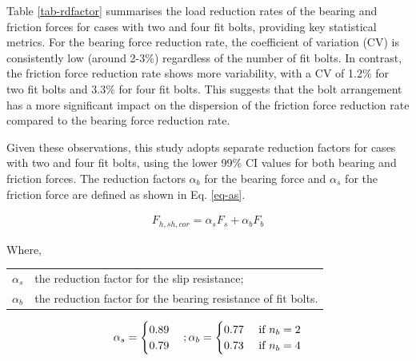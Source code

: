 Table \ref{tab-rdfactor} summarises the load reduction rates of the bearing and friction forces for cases with two and four fit bolts, providing key statistical metrics. For the bearing force reduction rate, the coefficient of variation (CV) is consistently low (around 2-3\%) regardless of the number of fit bolts. In contrast, the friction force reduction rate shows more variability, with a CV of 1.2\% for two fit bolts and 3.3\% for four fit bolts. This suggests that the bolt arrangement has a more significant impact on the dispersion of the friction force reduction rate compared to the bearing force reduction rate.

Given these observations, this study adopts separate reduction factors for cases with two and four fit bolts, using the lower 99\% CI values for both bearing and friction forces. The reduction factors $\alpha_b$ for the bearing force and $\alpha_s$ for the friction force are defined as shown in Eq. \ref{eq-as}.

\begin{equation}
    \begin{aligned}
        F_{h,sh,cor} = \alpha_s F_s+\alpha_{b} F_b
    \end{aligned}
    \label{eq-pvh-2}
\end{equation}

Where,

\begin{tabularx}{0.95\linewidth}{ l X }
$\alpha_s$ & the reduction factor for the slip resistance;\\ 
$\alpha_b$ & the reduction factor for the bearing resistance of fit bolts.\\
\end{tabularx}

\begin{equation}
\alpha_s =
\begin{cases} 
0.89  \\ 
0.79
\end{cases} \space ; 
\alpha_b = \begin{cases}
0.77 & \text { if } n_b = 2\\
0.73 & \text { if } n_b = 4
\end{cases}
\label{eq-as}
\end{equation}



